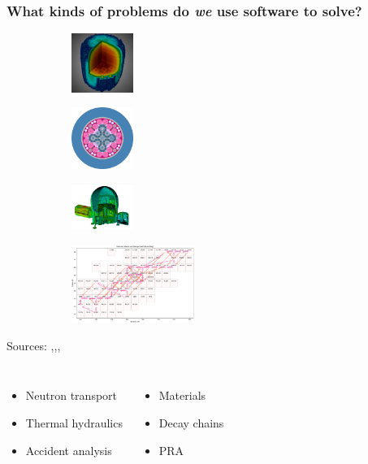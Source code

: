 \begin{frame}
    \frametitle{What kinds of problems do {\it we} use software to solve?}

    \begin{figure}[htpb]
        \begin{subfigure}
            \centering
            \includegraphics[width=2cm]{images/exasmr.png}
        \end{subfigure}
        \begin{subfigure}
           \centering
           \includegraphics[width=2cm]{images/atr.png} 
        \end{subfigure}
        \begin{subfigure}
           \centering
           \includegraphics[width=2cm]{images/hab1.png} 
        \end{subfigure}
        \begin{subfigure}
            \centering
            \includegraphics[width=4cm]{images/transmutation.png}
        \end{subfigure}
    \end{figure}
    \begin{center}
      {\tiny Sources: \cite{exasmr_fig},\cite{openmc_atr_slice},\cite{dagmc_nasa_module},\cite{armi_transmutation_fig}}
    \end{center}
    \pause\medskip
    \begin{columns}
    \column[t]{5cm}
    \begin{itemize}
        \item Neutron transport
        \item Thermal hydraulics
        \item Accident analysis
    \end{itemize}

    \column[t]{5cm}
    \begin{itemize}
        \item Materials
        \item Decay chains
        \item PRA
    \end{itemize}
    
    \end{columns}
\end{frame}


